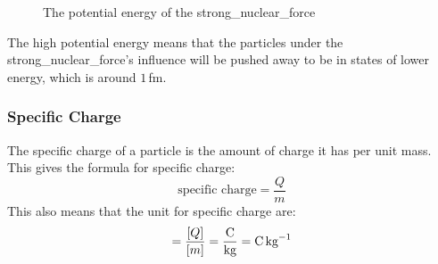             \begin{figure}
                \centering
                \caption{The potential energy of the \gls{strong_nuclear_force}}
            \end{figure}

            The high potential energy means that the particles under the \gls{strong_nuclear_force}'s influence will be pushed away to be in states of lower energy, which is around $1\,$fm.

        \subsubsection{Specific Charge}
            The specific charge of a particle is the amount of charge it has per unit mass.
            This gives the formula for specific charge:
            \begin{equation}
                \text{specific charge}=\frac{Q}{m}
            \end{equation}
            This also means that the unit for specific charge are:
            \begin{equation}
                [\text{specific charge}]=\frac{[Q]}{[m]}=\frac{\text{C}}{\text{kg}}=\text{C\,kg}^{-1}
            \end{equation}

